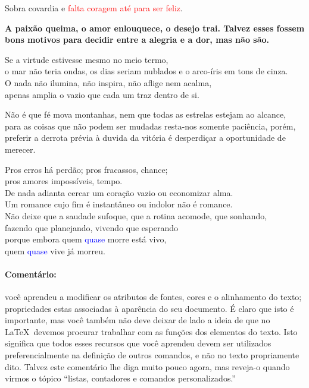 \documentclass[a4paper,10pt,twocolumn,landscape]{article}
\newcounter{exercicio}
\newenvironment{exercicio}{%
		\refstepcounter{exercicio}%
		\noindent\colorbox{blue!60!black}{\makebox[\columnwidth-\fboxsep*2][c]{\textbf{\color{white}Exercício~\theexercicio}}}\smallskip
	}{\par}
\begin{document}
\begin{exercicio}
		\bigskip
			
		\centering
		{\large\sffamily
		Sobra {\LARGE covardia} e \textcolor{red}{falta {\LARGE coragem} até para ser \LARGE{feliz}}.}
		
		\flushleft
		\textbf{A paixão queima, o amor enlouquece, o desejo trai. Talvez esses fossem bons motivos para decidir entre a alegria e a dor, mas não são.}
			
		\flushleft
		Se a virtude estivesse mesmo no meio termo,\\
		o mar não teria ondas, os dias seriam nublados e o arco-íris em tons de cinza.\\
		O nada não ilumina, não inspira,	não aflige nem acalma,\\
		apenas amplia o vazio que cada um traz dentro de si.
		
		\flushright
		{\ttfamily Não é que fé mova montanhas, nem que todas as estrelas estejam ao alcance, para as coisas que não podem ser mudadas resta-nos somente paciência, porém, preferir a derrota prévia à duvida da vitória é desperdiçar a oportunidade de merecer}.
		
		\flushleft
		\scriptsize Pros erros há perdão; pros fracassos, chance;\\
		pros amores impossíveis, tempo.\\
		De nada adianta cercar um coração vazio ou economizar alma.\\
		Um romance cujo fim é instantâneo ou indolor não é romance.\\
		Não deixe que a saudade sufoque, que a rotina acomode, que sonhando,\\
		fazendo que planejando, vivendo que esperando\\
		porque embora quem \textcolor{blue}{quase} morre está vivo,\\
		quem \textcolor{blue}{quase} vive já morreu.
		
	\end{exercicio}	
	
	\vfill
	
	\paragraph{\textbf{Comentário:}} você aprendeu a modificar os atributos de fontes, cores e o alinhamento do texto; propriedades estas associadas à aparência do seu documento. É claro que isto é importante, mas você também não deve deixar de lado a ideia de que no \LaTeX\ devemos procurar trabalhar com as funções dos elementos do texto. Isto significa que todos esses recursos que você aprendeu devem ser utilizados preferencialmente na definição de outros comandos, e não no texto propriamente dito. Talvez este comentário lhe diga muito pouco agora, mas reveja-o quando virmos o tópico ``listas, contadores e comandos personalizados\rlap.''
	
\end{document}
